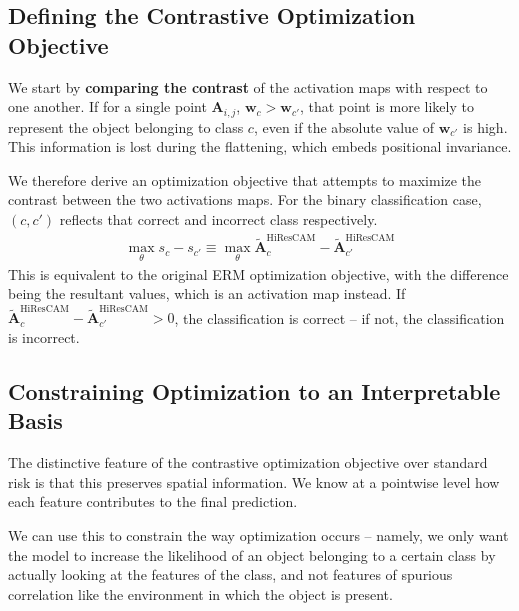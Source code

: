 \documentclass{article}
\begin{document}
\subsection{Defining the Contrastive Optimization Objective}

We start by \textbf{comparing the contrast} of the activation maps with respect to one another. If for a single point $\bm{A}_{i,j}$, $\bm{w}_c > \bm{w}_{c'}$, that point is more likely to represent the object belonging to class $c$, even if the absolute value of $\bm{w}_{c'}$ is high. This information is lost during the flattening, which embeds positional invariance.

We therefore derive an optimization objective that attempts to maximize the contrast between the two activations maps. For the binary classification case, $(c, c')$ reflects that correct and incorrect class respectively.
\begin{gather}
	\max_{\theta} s_c - s_{c'} \equiv \max_{\theta} \tilde{\mathcal{\bm{A}}}_{c}^{\text{HiResCAM}} - \tilde{\mathcal{\bm{A}}}_{c'}^{\text{HiResCAM}}
\end{gather}
This is equivalent to the original ERM optimization objective, with the difference being the resultant values, which is an activation map instead. If $\tilde{\mathcal{\bm{A}}}_{c}^{\text{HiResCAM}} - \tilde{\mathcal{\bm{A}}}_{c'}^{\text{HiResCAM}} > 0$, the classification is correct -- if not, the classification is incorrect.

\subsection{Constraining Optimization to an Interpretable Basis}

The distinctive feature of the contrastive optimization objective over standard risk is that this preserves spatial information. We know at a pointwise level how each feature contributes to the final prediction.

We can use this to constrain the way optimization occurs -- namely, we only want the model to increase the likelihood of an object belonging to a certain class by actually looking at the features of the class, and not features of spurious correlation like the environment in which the object is present.
\end{document}
